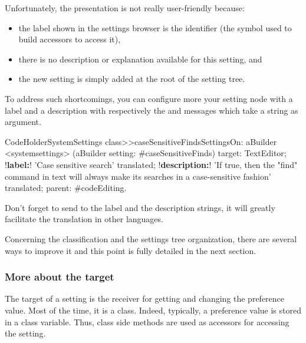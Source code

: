\documentclass[a4paper,10pt,twoside]{book}
\begin{document}
Unfortunately, the presentation is not really user-friendly because:
\begin{itemize}
\item the label shown in the settings browser is the identifier (the symbol used to build accessors to access it),
\item there is no description or explanation available for this setting, and
\item the new setting is simply added at the root of the setting tree. 
\end{itemize}

To address such shortcomings, you can configure more your setting node with a label and a description with respectively the  and  messages which take a string as argument. 

\begin{code}{}
CodeHolderSystemSettings class>>caseSensitiveFindsSettingsOn: aBuilder
	<systemsettings>
	(aBuilder setting: #caseSensitiveFinds) 
		target: TextEditor;
		!\textbf{label:}! 'Case sensitive search' translated;
		!\textbf{description:}! 'If true, then the "find" command in text will always make its searches in a case-sensitive fashion' translated;
		parent: #codeEditing.
\end{code}

Don't forget to send  to the label and the description strings, it will greatly facilitate the translation in other languages.

Concerning the classification and the settings tree organization, there are several ways to improve it and this point is fully detailed in the next section.

\subsubsection{More about the target}
The target of a setting is the receiver for getting and changing the preference value. Most of the time, it is a class. Indeed, typically, a preference value is stored in a class variable. Thus, class side methods are used as accessors for accessing the setting. 
\end{document}
